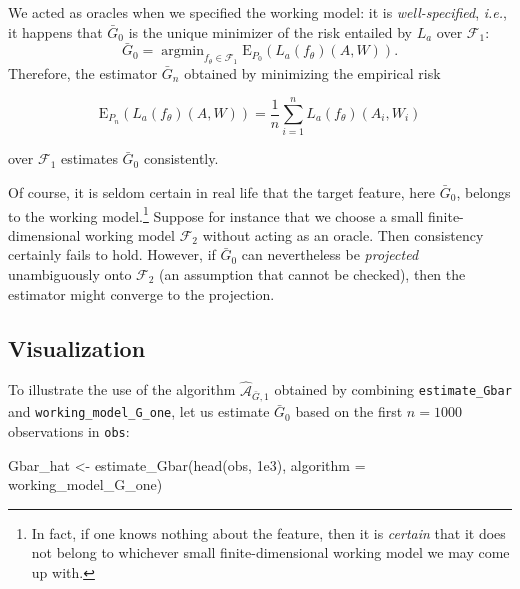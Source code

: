\documentclass[
  11pt,
  openright,twoside]{book}
\newenvironment{Shaded}{\begin{snugshade}}{\end{snugshade}}
\newcommand{\AttributeTok}[1]{\textcolor[rgb]{0.77,0.63,0.00}{#1}}
\newcommand{\FloatTok}[1]{\textcolor[rgb]{0.00,0.00,0.81}{#1}}
\newcommand{\FunctionTok}[1]{\textcolor[rgb]{0.00,0.00,0.00}{#1}}
\newcommand{\NormalTok}[1]{#1}
\newcommand{\OtherTok}[1]{\textcolor[rgb]{0.56,0.35,0.01}{#1}}
\newcommand{\Algo}{\widehat{\mathcal{A}}}
\newcommand{\calF}{\mathcal{F}}
\newcommand{\Exp}{\textrm{E}}
\newcommand{\Gbar}{\bar{G}}
\theoremstyle{definition}
\theoremstyle{definition}
\theoremstyle{definition}
\theoremstyle{definition}
\theoremstyle{remark}
\begin{document}
We acted as oracles when we specified the working model: it is
\emph{well-specified}, \emph{i.e.}, it happens that \(\Gbar_{0}\) is the unique minimizer
of the risk entailed by \(L_{a}\) over \(\calF_{1}\): \begin{equation*}\Gbar_{0} =
\mathop{\arg\min}_{f_{\theta}        \in        \calF_{1}}        \Exp_{P_{0}}
\left(L_{a}(f_{\theta})(A,W)\right).\end{equation*} Therefore, the estimator
\(\Gbar_{n}\) obtained by minimizing the empirical risk

\begin{equation*}
\Exp_{P_{n}} \left(L_{a}(f_{\theta})(A,W)\right)  = \frac{1}{n} \sum_{i=1}^{n}
L_{a}(f_{\theta})(A_{i},W_{i})
\end{equation*}

over \(\calF_{1}\) estimates \(\Gbar_{0}\) consistently.

Of course, it is seldom certain in real life that the target feature, here
\(\Gbar_{0}\), belongs to the working model.\footnote{In fact, if one knows nothing
  about the feature, then it is \emph{certain} that it does not belong to whichever
  small finite-dimensional working model we may come up with.} Suppose for
instance that we choose a small finite-dimensional working model \(\calF_{2}\)
without acting as an oracle. Then consistency certainly fails to hold.
However, if \(\Gbar_{0}\) can nevertheless be \emph{projected} unambiguously onto
\(\calF_{2}\) (an assumption that cannot be checked), then the estimator might
converge to the projection.

\hypertarget{algo-Gbar-one}{%
\subsection{Visualization}\label{algo-Gbar-one}}

To illustrate the use of the algorithm \(\Algo_{\Gbar,1}\) obtained by combining
\texttt{estimate\_Gbar} and \texttt{working\_model\_G\_one}, let us estimate \(\Gbar_{0}\) based
on the first \(n = 1000\) observations in \texttt{obs}:

\begin{Shaded}
\begin{Highlighting}[]
\NormalTok{Gbar\_hat }\OtherTok{\textless{}{-}} \FunctionTok{estimate\_Gbar}\NormalTok{(}\FunctionTok{head}\NormalTok{(obs, }\FloatTok{1e3}\NormalTok{), }\AttributeTok{algorithm =}\NormalTok{ working\_model\_G\_one)}
\end{Highlighting}
\end{Shaded}
\end{document}
